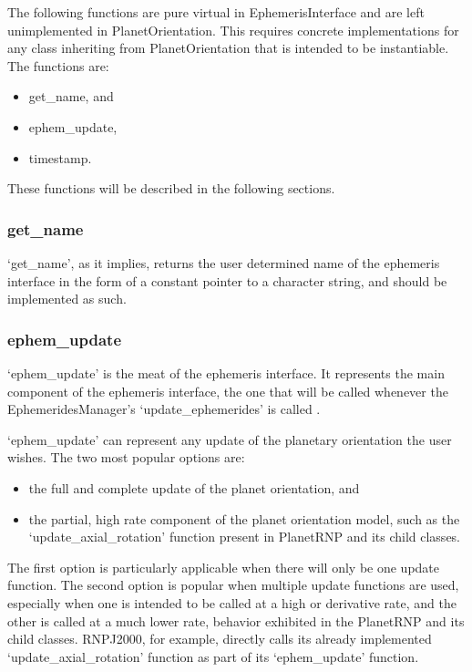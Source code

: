The following functions are pure virtual in EphemerisInterface and are left
unimplemented in PlanetOrientation. This requires
concrete implementations for any class inheriting from PlanetOrientation
that is intended to be instantiable. The functions are:

\begin{itemize}
\item{get\_name, and}
\item{ephem\_update,}
\item{timestamp.}
\end{itemize}

These functions will be described in the following sections.

\subsubsection{get\_name}

`get\_name', as it implies, returns the user determined name of the ephemeris interface in the form of
a constant pointer to a character string, and should be implemented as such.

\subsubsection{ephem\_update}

`ephem\_update' is the meat of the ephemeris interface. It represents the main component of
the ephemeris interface, the one that will be called whenever the EphemeridesManager's
`update\_ephemerides' is called \cite{dynenv:EPHEMERIDES}. 

`ephem\_update' can represent any
update of the planetary orientation the user wishes. The two most popular options are:

\begin{itemize}
\item{the full and complete update of the planet orientation, and}
\item{the partial, high rate component of the planet orientation model, such as the 
`update\_axial\_rotation' function present in PlanetRNP and its child classes.}
\end{itemize}

The first option is particularly applicable when there will only be one update function.
The second option is popular when multiple update functions are used, especially when
one is intended to be called at a high or derivative rate, and the other is called
at a much lower rate, behavior exhibited in the PlanetRNP and its child classes. RNPJ2000,
for example, directly calls its already implemented `update\_axial\_rotation' function as part of
its `ephem\_update' function.

